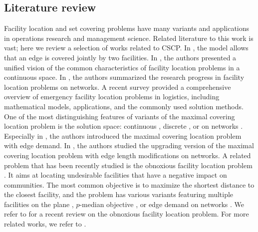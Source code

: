 \subsection{Literature review}

Facility location and set covering problems have many variants and applications in operations research and management science. Related literature to this work is vast; here we review a selection of works related to CSCP. In \cite{sadigh2010mixed}, the model allows that an edge is covered jointly by two facilities. In \cite{Schobel2019}, the authors presented a unified vision of the common characteristics of facility location problems in a continuous space. In \cite{puerto2018extensive}, the authors summarized the research progress in facility location problems on networks. A recent survey \cite{wang2021emergency} provided a comprehensive overview of  emergency facility location problems in logistics, including mathematical models, applications, and the commonly used solution methods.  One of the most distinguishing features of variants of the maximal covering location problem is the solution space: continuous \cite{chapter-plastria, bansal2017planar}, discrete \cite{chapter-marin, cordeau2019benders}, or on networks \cite{bucarey2022benders,berman2016covering}. Especially in \cite{berman2016covering}, the authors  introduced the maximal covering location problem with edge demand. In \cite{baldomero2022upgrading}, the authors studied the upgrading version of the maximal covering location problem with edge length modifications on networks. A related problem that has been recently studied is the obnoxious facility location problem \cite{drezner2018weber}. It aims at locating undesirable facilities that have a negative impact on communities. The most common  objective is to maximize the shortest distance to the closest facility, and the problem has various variants featuring multiple facilities on the plane \cite{drezner2019planar,kalczynski2021obnoxious}, $p$-median objective \cite{kalczynski2022obnoxious}, or edge demand on networks \cite{berman2016covering}. We refer to \cite{church2022review} for a recent review on the obnoxious facility location problem. For more related works, we refer to \cite{akgun2015risk,paul2017multiobjective,fukunaga2016covering,berman2011big,hudec1994confined}. 

